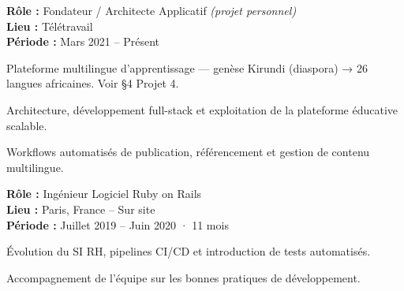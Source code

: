 \begin{cvgroup}

\begin{cvmetadata}
\textbf{Rôle :} Fondateur / Architecte Applicatif {\normalfont\itshape (projet personnel)} \\
\textbf{Lieu :} Télétravail \\
\textbf{Période :} Mars 2021 – Présent
\end{cvmetadata}

\begin{cvprojectsummary}
Plateforme multilingue d'apprentissage — genèse Kirundi (diaspora) → 26 langues africaines. Voir §4 Projet 4.
\end{cvprojectsummary}


\begin{cvdetailmissions}
  \item {Architecture, développement full-stack et exploitation de la plateforme éducative scalable.}
  \item {Workflows automatisés de publication, référencement et gestion de contenu multilingue.}
\end{cvdetailmissions}

\end{cvgroup}

\begin{cvgroup}

\begin{cvmetadata}
\textbf{Rôle :} Ingénieur Logiciel Ruby on Rails \\
\textbf{Lieu :} Paris, France – Sur site \\
\textbf{Période :} Juillet 2019 – Juin 2020 · 11 mois
\end{cvmetadata}


\begin{cvdetailmissions}
  \item {Évolution du SI RH, pipelines CI/CD et introduction de tests automatisés.}
  \item {Accompagnement de l'équipe sur les bonnes pratiques de développement.}
\end{cvdetailmissions}

\end{cvgroup}

